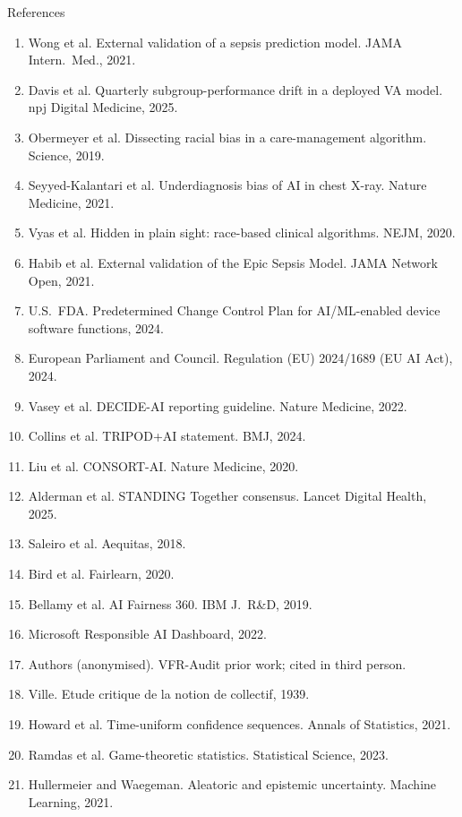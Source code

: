 \documentclass[aspectratio=169,11pt]{beamer}
\begin{document}
\begin{frame}[allowframebreaks]{References}
\scriptsize
\begin{enumerate}
\item Wong et al. External validation of a sepsis prediction model. JAMA Intern.\ Med., 2021.
\item Davis et al. Quarterly subgroup-performance drift in a deployed VA model. npj Digital Medicine, 2025.
\item Obermeyer et al. Dissecting racial bias in a care-management algorithm. Science, 2019.
\item Seyyed-Kalantari et al. Underdiagnosis bias of AI in chest X-ray. Nature Medicine, 2021.
\item Vyas et al. Hidden in plain sight: race-based clinical algorithms. NEJM, 2020.
\item Habib et al. External validation of the Epic Sepsis Model. JAMA Network Open, 2021.
\item U.S.\ FDA. Predetermined Change Control Plan for AI/ML-enabled device software functions, 2024.
\item European Parliament and Council. Regulation (EU) 2024/1689 (EU AI Act), 2024.
\item Vasey et al. DECIDE-AI reporting guideline. Nature Medicine, 2022.
\item Collins et al. TRIPOD+AI statement. BMJ, 2024.
\item Liu et al. CONSORT-AI. Nature Medicine, 2020.
\item Alderman et al. STANDING Together consensus. Lancet Digital Health, 2025.
\item Saleiro et al. Aequitas, 2018.
\item Bird et al. Fairlearn, 2020.
\item Bellamy et al. AI Fairness 360. IBM J.\ R\&D, 2019.
\item Microsoft Responsible AI Dashboard, 2022.
\item Authors (anonymised). VFR-Audit prior work; cited in third person.
\item Ville. Etude critique de la notion de collectif, 1939.
\item Howard et al. Time-uniform confidence sequences. Annals of Statistics, 2021.
\item Ramdas et al. Game-theoretic statistics. Statistical Science, 2023.
\item Hullermeier and Waegeman. Aleatoric and epistemic uncertainty. Machine Learning, 2021.

\end{enumerate}
\end{frame}
\end{document}
